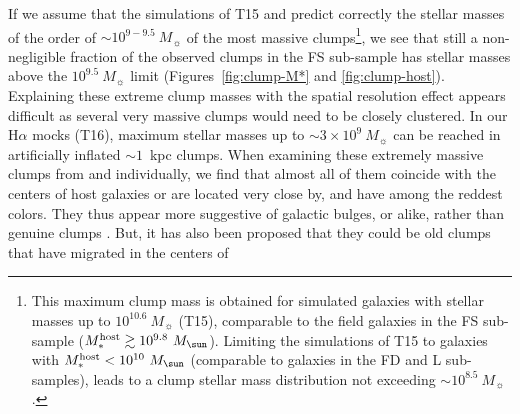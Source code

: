\documentclass[twocolumn]{aastex61}
\begin{document}

If we assume that the simulations of T15 and \citet{mandelker17} predict 
correctly the stellar masses of the order of $\sim 10^{9-9.5}~M_{\sun}$
of the most massive clumps\footnote{This maximum clump mass is obtained for 
simulated galaxies with stellar masses up to $10^{10.6}~M_{\sun}$ (T15),
comparable to the field galaxies in the FS sub-sample ($M_*^{\rm host} \gtrsim 
10^{9.8}~M_{\sun}$). Limiting the simulations of T15 to galaxies with 
$M_*^{\rm host} < 10^{10}~M_{\sun}$ (comparable to galaxies in the FD and L 
sub-samples), leads to a clump stellar mass distribution not exceeding 
$\sim 10^{8.5}~M_{\sun}$.}, we see that still a non-negligible fraction 
of the observed clumps in the FS sub-sample has stellar masses above the 
$10^{9.5}~M_{\sun}$ limit (Figures~\ref{fig:clump-M*} and \ref{fig:clump-host}). 
Explaining these extreme clump masses with the spatial resolution effect appears 
difficult as several very massive clumps would need to be closely clustered.
In our H$\alpha$ mocks (T16), maximum stellar masses up to $\sim 3\times 
10^9~M_{\sun}$ can be reached in artificially inflated $\sim 1$~kpc clumps. 
When examining these extremely massive clumps from \citet{forster11} and 
\citet{guo12} individually, we find that almost all of them coincide with the 
centers of host galaxies or are located very close by, and have among the 
reddest colors. They thus appear more suggestive of galactic bulges, or alike, 
rather than genuine clumps \citep[see also][]{elmegreen09}. But, it has also been 
proposed that they could be old clumps that have migrated in the centers of 
\end{document}
